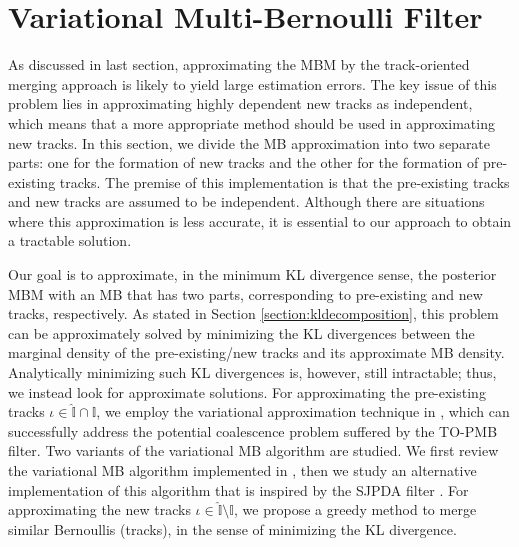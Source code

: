 \documentclass[journal]{IEEEtran}
\begin{document}
\section{Variational Multi-Bernoulli Filter}

As discussed in last section, approximating the MBM by the track-oriented merging approach is likely to yield large estimation errors. The key issue of this problem lies in approximating highly dependent new tracks as independent, which means that a more appropriate method should be used in approximating new tracks. In this section, we divide the MB approximation into two separate parts: one for the formation of new tracks and the other for the formation of pre-existing tracks. The premise of this implementation is that the pre-existing tracks and new tracks are assumed to be independent. Although there are situations where this approximation is less accurate, it is essential to our approach to obtain a tractable solution. 

Our goal is to approximate, in the minimum KL divergence sense, the posterior MBM with an MB that has two parts, corresponding to pre-existing and new tracks, respectively. As stated in Section \ref{section:kldecomposition}, this problem can be approximately solved by minimizing the KL divergences between the marginal density of the pre-existing/new tracks and its approximate MB density. Analytically minimizing such KL divergences is, however, still intractable; thus, we instead look for approximate solutions. 
For approximating the pre-existing tracks $\iota\in\hat{\mathbb{I}}\cap\mathbb{I}$, we employ the variational approximation technique in \cite{variational}, which can successfully address the potential coalescence problem suffered by the TO-PMB filter. Two variants of the variational MB algorithm are studied. We first review the variational MB algorithm implemented in \cite{variational}, then we study an alternative implementation of this algorithm that is inspired by the SJPDA filter \cite{sjpda}. For approximating the new tracks $\iota\in\hat{\mathbb{I}}\setminus\mathbb{I}$, we propose a greedy method to merge similar Bernoullis (tracks), in the sense of minimizing the KL divergence. 

\end{document}
